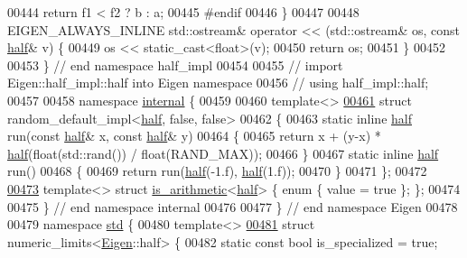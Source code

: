 \begin{DoxyCode}
00444   \textcolor{keywordflow}{return} f1 < f2 ? b : a;
00445 \textcolor{preprocessor}{#endif}
00446 \}
00447 
00448 EIGEN\_ALWAYS\_INLINE std::ostream& operator << (std::ostream& os, \textcolor{keyword}{const} \hyperlink{struct_eigen_1_1half}{half}& v) \{
00449   os << static\_cast<float>(v);
00450   \textcolor{keywordflow}{return} os;
00451 \}
00452 
00453 \} \textcolor{comment}{// end namespace half\_impl}
00454 
00455 \textcolor{comment}{// import Eigen::half\_impl::half into Eigen namespace}
00456 \textcolor{comment}{// using half\_impl::half;}
00457 
00458 \textcolor{keyword}{namespace }\hyperlink{namespaceinternal}{internal} \{
00459 
00460 \textcolor{keyword}{template}<>
\hyperlink{struct_eigen_1_1internal_1_1random__default__impl_3_01half_00_01false_00_01false_01_4}{00461} \textcolor{keyword}{struct }random\_default\_impl<\hyperlink{struct_eigen_1_1half}{half}, false, false>
00462 \{
00463   \textcolor{keyword}{static} \textcolor{keyword}{inline} \hyperlink{struct_eigen_1_1half}{half} run(\textcolor{keyword}{const} \hyperlink{struct_eigen_1_1half}{half}& x, \textcolor{keyword}{const} \hyperlink{struct_eigen_1_1half}{half}& y)
00464   \{
00465     \textcolor{keywordflow}{return} x + (y-x) * \hyperlink{struct_eigen_1_1half}{half}(\textcolor{keywordtype}{float}(std::rand()) / float(RAND\_MAX));
00466   \}
00467   \textcolor{keyword}{static} \textcolor{keyword}{inline} \hyperlink{struct_eigen_1_1half}{half} run()
00468   \{
00469     \textcolor{keywordflow}{return} run(\hyperlink{struct_eigen_1_1half}{half}(-1.f), \hyperlink{struct_eigen_1_1half}{half}(1.f));
00470   \}
00471 \};
00472 
\hyperlink{struct_eigen_1_1internal_1_1is__arithmetic_3_01half_01_4}{00473} \textcolor{keyword}{template}<> \textcolor{keyword}{struct }\hyperlink{struct_eigen_1_1internal_1_1is__arithmetic}{is\_arithmetic}<\hyperlink{struct_eigen_1_1half}{half}> \{ \textcolor{keyword}{enum} \{ value = \textcolor{keyword}{true} \}; \};
00474 
00475 \} \textcolor{comment}{// end namespace internal}
00476 
00477 \}  \textcolor{comment}{// end namespace Eigen}
00478 
00479 \textcolor{keyword}{namespace }\hyperlink{namespacestd}{std} \{
00480 \textcolor{keyword}{template}<>
\hyperlink{structstd_1_1numeric__limits_3_01_eigen_1_1half_01_4}{00481} \textcolor{keyword}{struct }numeric\_limits<\hyperlink{namespace_eigen}{Eigen}::half> \{
00482   \textcolor{keyword}{static} \textcolor{keyword}{const} \textcolor{keywordtype}{bool} is\_specialized = \textcolor{keyword}{true};

\end{DoxyCode}
